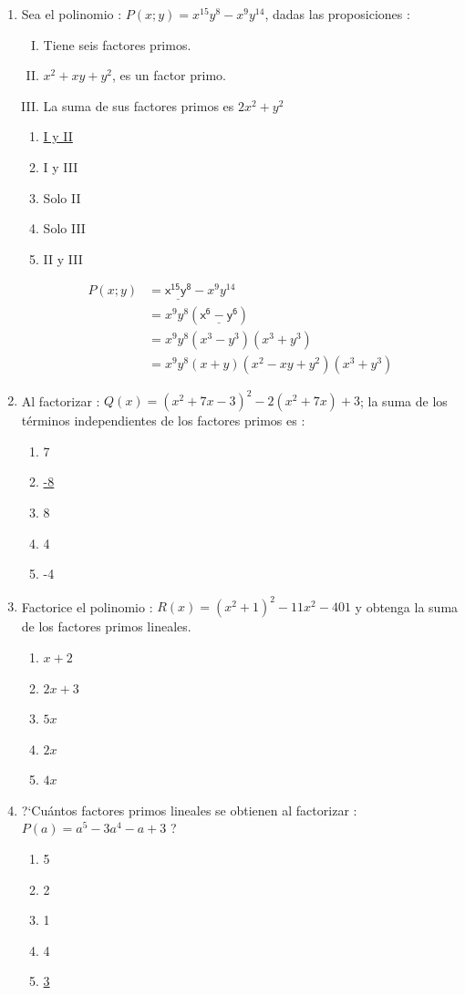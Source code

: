 \documentclass{article}
\begin{document}
\begin{enumerate}
\item{Sea el polinomio : $P(x;y) = x^{15}y^8 - x^9y^{14}$, dadas las proposiciones :
\begin{enumerate}[I.]
\item{Tiene seis factores primos.}
\item{$x^2 + xy + y^2$, es un factor primo.}
\item{La suma de sus factores primos es $2x^2 + y^2$}
\end{enumerate}
\begin{enumerate}
\item{\underline{I y II}}
\item{I y III}
\item{Solo II}
\item{Solo III}
\item{II y III}
\end{enumerate}
\begin{align*}
P(x;y) & = \underline{\mathsf{x^{15}y^8}} - x^9y^{14} \\
& = x^9y^8(\underline{\mathsf{x^6 - y^6}}) \\
& = x^9y^8(x^3 - y^3)(x^3 + y^3) \\
& = x^9y^8(x + y)(x^2 - xy + y^2)(x^3 + y^3) 
\end{align*}
}

\item{Al factorizar : $Q(x) = (x^2 + 7x -3)^2 - 2(x^2 + 7x) + 3$; la suma de los t\'erminos independientes de los factores primos es :
\begin{enumerate}
\item{7}
\item{\underline{-8}}
\item{8}
\item{4}
\item{-4}
\end{enumerate}
}

\item{Factorice el polinomio : $R(x) = (x^2 + 1)^2 - 11x^2 - 401$ y obtenga la suma de los factores primos lineales.
\begin{enumerate}
\item{$x + 2$}
\item{$2x + 3$}
\item{$5x$}
\item{\underline{$2x$}}
\item{$4x$}
\end{enumerate}
}

\item{?`Cu\'antos factores primos lineales se obtienen al factorizar : $P(a) = a^5 - 3a^4 - a + 3$ ?
\begin{enumerate}
\item{5}
\item{2}
\item{1}
\item{4}
\item{\underline{3}}
\end{enumerate}
}


\end{enumerate}
\end{document}
